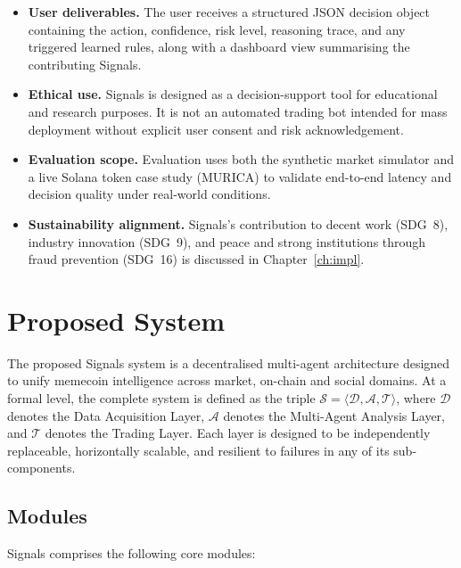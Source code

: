 \documentclass[12pt,a4paper,oneside,openany]{book}
\begin{document}
\begin{itemize}[leftmargin=8mm]
\item \textbf{User deliverables.} The user receives a structured JSON decision object containing the action, confidence, risk level, reasoning trace, and any triggered learned rules, along with a dashboard view summarising the contributing Signals.

\item \textbf{Ethical use.} Signals is designed as a decision-support tool for educational and research purposes. It is not an automated trading bot intended for mass deployment without explicit user consent and risk acknowledgement.

\item \textbf{Evaluation scope.} Evaluation uses both the synthetic market simulator and a live Solana token case study (MURICA) to validate end-to-end latency and decision quality under real-world conditions.

\item \textbf{Sustainability alignment.} Signals's contribution to decent work (SDG~8), industry innovation (SDG~9), and peace and strong institutions through fraud prevention (SDG~16) is discussed in Chapter~\ref{ch:impl}.
\end{itemize}

\chapter{Proposed System}
\label{ch:proposed}

The proposed Signals system is a decentralised multi-agent architecture designed to unify memecoin intelligence across market, on-chain and social domains. At a formal level, the complete system is defined as the triple $\mathcal{S} = \langle \mathcal{D}, \mathcal{A}, \mathcal{T} \rangle$, where $\mathcal{D}$ denotes the Data Acquisition Layer, $\mathcal{A}$ denotes the Multi-Agent Analysis Layer, and $\mathcal{T}$ denotes the Trading Layer. Each layer is designed to be independently replaceable, horizontally scalable, and resilient to failures in any of its sub-components.

\section{Modules}
Signals comprises the following core modules:
\end{document}
